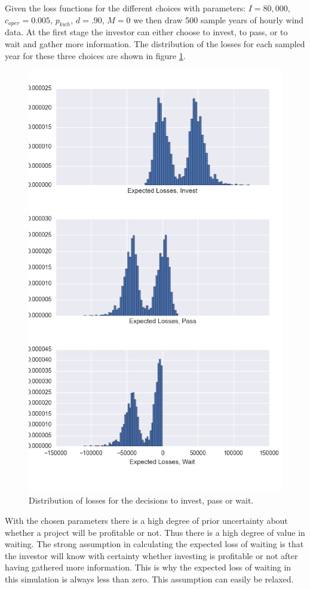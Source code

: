 \documentclass[11pt]{article}
\begin{document}
Given the loss functions for the different choices with parameters: $I=80,000$, $c_{oper}=0.005$, $p_{kwh}$, $d=.90$, $M=0$ we then draw 500 sample years of hourly wind data. At the first stage the investor can either choose to invest, to pass, or to wait and gather more information. The distribution of the losses for each sampled year for these three choices are shown in figure \ref{losses}.

\begin{figure}
	\centering
	\includegraphics[width=.8\textwidth]{figures/losses.png}
	\caption{Distribution of losses for the decisions to invest, pass or wait.}
	\label{losses}
\end{figure}

With the chosen parameters there is a high degree of prior uncertainty about whether a project will be profitable or not. Thus there is a high degree of value in waiting. The strong assumption in calculating the expected loss of waiting is that the investor will know with certainty whether investing is profitable or not after having gathered more information. This is why the expected loss of waiting in this simulation is always less than zero. This assumption can easily be relaxed.
\end{document}
